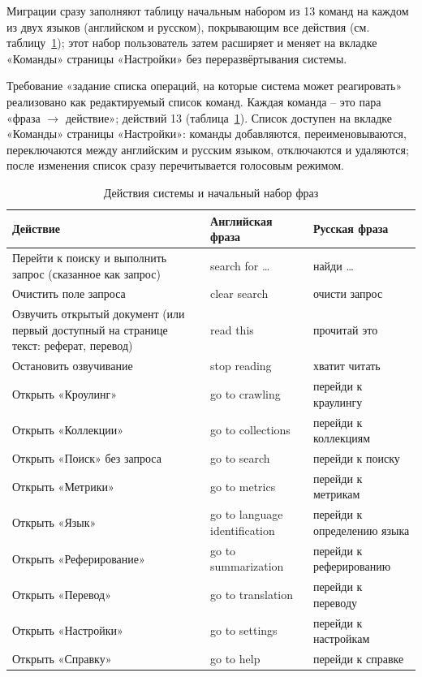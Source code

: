 Миграции сразу заполняют таблицу начальным набором из 13 команд на
каждом из двух языков (английском и русском), покрывающим все
действия (см. таблицу~\ref{tab:actions}); этот набор пользователь
затем расширяет и меняет на вкладке «Команды» страницы «Настройки» без
переразвёртывания системы.


Требование «задание списка операций, на которые система может
реагировать» реализовано как редактируемый список команд. Каждая
команда -- это пара «фраза $\to$ действие»; действий 13
(таблица~\ref{tab:actions}). Список доступен на вкладке «Команды»
страницы «Настройки»: команды добавляются, переименовываются,
переключаются между английским и русским языком, отключаются и
удаляются; после изменения список сразу перечитывается голосовым
режимом.

\begin{table}[H]
  \centering
  \caption{Действия системы и начальный набор фраз}
  \label{tab:actions}
  \small
  \begin{tabular}{|p{}|p{}|p{}|}
    \hline
    \textbf{Действие} & \textbf{Английская фраза} & \textbf{Русская фраза} \\
    \hline
    Перейти к поиску и выполнить запрос (сказанное как запрос) & search for \ldots & найди \ldots \\
    \hline
    Очистить поле запроса & clear search & очисти запрос \\
    \hline
    Озвучить открытый документ (или первый доступный на странице текст: реферат, перевод) & read this & прочитай это \\
    \hline
    Остановить озвучивание & stop reading & хватит читать \\
    \hline
    Открыть «Кроулинг» & go to crawling & перейди к краулингу \\
    \hline
    Открыть «Коллекции» & go to collections & перейди к коллекциям \\
    \hline
    Открыть «Поиск» без запроса & go to search & перейди к поиску \\
    \hline
    Открыть «Метрики» & go to metrics & перейди к метрикам \\
    \hline
    Открыть «Язык» & go to language identification & перейди к определению языка \\
    \hline
    Открыть «Реферирование» & go to summarization & перейди к реферированию \\
    \hline
    Открыть «Перевод» & go to translation & перейди к переводу \\
    \hline
    Открыть «Настройки» & go to settings & перейди к настройкам \\
    \hline
    Открыть «Справку» & go to help & перейди к справке \\
    \hline
  \end{tabular}
\end{table}

